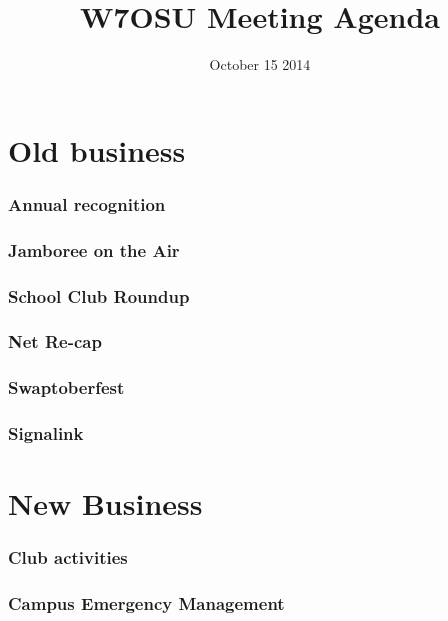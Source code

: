 \documentclass[10pt,letterpaper]{article}
\title{W7OSU Meeting Agenda}
\date{October 15 2014}
\begin{document}
 
\maketitle

\part*{Old business}
\section{Annual recognition}
\section{Jamboree on the Air}
\section{School Club Roundup}
\section{Net Re-cap}
\section{Swaptoberfest}
\section{Signalink}
\part*{New Business}
\section{Club activities}
\section{Campus Emergency Management}
\end{document}
